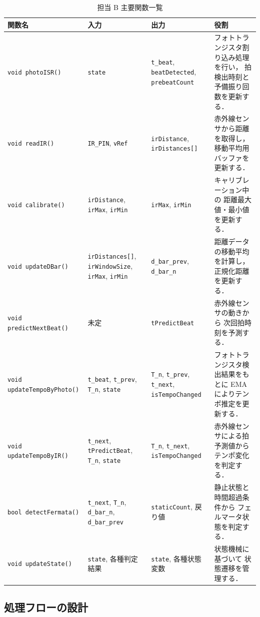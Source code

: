 \documentclass[lualatex,book,paper=a4paper,jafontsize=11.5pt,jafontscale=1.05,oneside]{jlreq}
\begin{document}
\begin{table}[H]
\centering
\caption{担当 B 主要関数一覧}
\begin{tabular}{p{3.5cm}p{4cm}p{4cm}p{4.5cm}}
\hline
\textbf{関数名} & \textbf{入力} & \textbf{出力} & \textbf{役割} \\
\hline
\hline
\texttt{void photoISR()} &
\texttt{state} &
\texttt{t\_beat},
\texttt{beatDetected},
\texttt{prebeatCount} &
フォトトランジスタ割り込み処理を行い，
拍検出時刻と予備振り回数を更新する． \\
\hline
\texttt{void readIR()} &
\texttt{IR\_PIN},
\texttt{vRef} &
\texttt{irDistance},
\texttt{irDistances[]} &
赤外線センサから距離を取得し，
移動平均用バッファを更新する． \\
\hline
\texttt{void calibrate()} &
\texttt{irDistance},
\texttt{irMax},
\texttt{irMin} &
\texttt{irMax},
\texttt{irMin} &
キャリブレーション中の
距離最大値・最小値を更新する． \\
\hline
\texttt{void updateDBar()} &
\texttt{irDistances[]},
\texttt{irWindowSize},
\texttt{irMax},
\texttt{irMin} &
\texttt{d\_bar\_prev},
\texttt{d\_bar\_n} &
距離データの移動平均を計算し，
正規化距離を更新する． \\
\hline
\texttt{void predictNextBeat()} &
未定 &
\texttt{tPredictBeat} &
赤外線センサの動きから
次回拍時刻を予測する． \\
\hline
\texttt{void updateTempoByPhoto()} &
\texttt{t\_beat},
\texttt{t\_prev},
\texttt{T\_n},
\texttt{state} &
\texttt{T\_n},
\texttt{t\_prev},
\texttt{t\_next},
\texttt{isTempoChanged} &
フォトトランジスタ検出結果をもとに
EMA によりテンポ推定を更新する． \\
\hline
\texttt{void updateTempoByIR()} &
\texttt{t\_next},
\texttt{tPredictBeat},
\texttt{T\_n},
\texttt{state} &
\texttt{T\_n},
\texttt{t\_next},
\texttt{isTempoChanged} &
赤外線センサによる拍予測値から
テンポ変化を判定する． \\
\hline
\texttt{bool detectFermata()} &
\texttt{t\_next},
\texttt{T\_n},
\texttt{d\_bar\_n},
\texttt{d\_bar\_prev} &
\texttt{staticCount},
戻り値 &
静止状態と時間超過条件から
フェルマータ状態を判定する． \\
\hline
\texttt{void updateState()} &
\texttt{state},
各種判定結果 &
\texttt{state},
各種状態変数 &
状態機械に基づいて
状態遷移を管理する． \\
\hline
\end{tabular}
\end{table}

\subsection{処理フローの設計}
\end{document}
